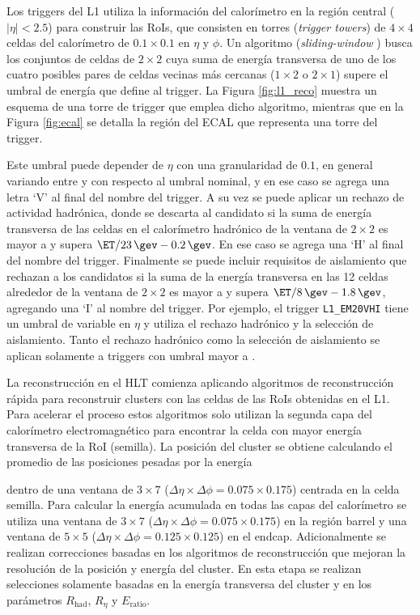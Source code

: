 Los triggers del L1 utiliza la información del calorímetro en la región central ($|\eta|<2.5$) para construir las RoIs, que consisten en torres (\textit{trigger towers}) de $4\times4$ celdas del calorímetro de $0.1\times0.1$ en $\eta$ y $\phi$. Un algoritmo (\textit{sliding-window} \cite{Lampl:1099735}) busca los conjuntos de celdas de $2\times2$ cuya suma de energía transversa de uno de los cuatro posibles pares de celdas vecinas más cercanas ($1\times2$ o $2\times1$) supere el umbral de energía que define al trigger. La Figura \ref{fig:l1_reco} muestra un esquema de una torre de trigger que emplea dicho algoritmo, mientras que en la Figura \ref{fig:ecal} se detalla la región del ECAL que representa una torre del trigger.


Este umbral puede depender de $\eta$ con una granularidad de $0.1$, en general variando entre  y  con respecto al umbral nominal, y en ese caso se agrega una letra `V' al final del nombre del trigger. A su vez se puede aplicar un rechazo de actividad hadrónica, donde se descarta al candidato si la suma de energía transversa de las celdas en el calorímetro hadrónico de la ventana de $2\times2$ es mayor a  y supera $\ET/23\,\gev-0.2\,\gev$. En ese caso se agrega una `H' al final del nombre del trigger. Finalmente se puede incluir requisitos de aislamiento que rechazan a los candidatos si la suma de la energía transversa en las 12 celdas alrededor de la ventana de $2\times2$ es mayor a  y supera $\ET/8\,\gev-1.8\,\gev$, agregando una `I' al nombre del trigger. Por ejemplo, el trigger \texttt{L1\_EM20VHI} tiene un umbral de  variable en $\eta$ y utiliza el rechazo hadrónico y la selección de aislamiento. Tanto el rechazo hadrónico como la selección de aislamiento se aplican solamente a triggers con umbral mayor a .



La reconstrucción en el HLT comienza aplicando algoritmos de reconstrucción rápida para reconstruir clusters con las celdas de las RoIs obtenidas en el L1. Para acelerar el proceso estos algoritmos solo utilizan la segunda capa del calorímetro electromagnético para encontrar la celda con mayor energía transversa de la RoI (semilla). La posición del cluster se obtiene calculando el promedio de las posiciones pesadas por la energía

dentro de una ventana de $3\times7$ ($\Delta\eta\times\Delta\phi = 0.075\times0.175$) centrada en la celda semilla. Para calcular la energía acumulada 
en todas las capas del calorímetro
se utiliza una ventana de $3\times7$ ($\Delta\eta\times\Delta\phi = 0.075\times0.175$) en la región barrel y una ventana de $5\times5$ ($\Delta\eta\times\Delta\phi = 0.125\times0.125$) en el endcap. Adicionalmente se realizan correcciones basadas en los algoritmos de reconstrucción que mejoran la resolución de la posición y energía del cluster. En esta etapa se realizan selecciones solamente basadas en la energía transversa del cluster y en los parámetros $R_{\text{had}}$, $R_{\eta}$ y $E_{\text{ratio}}$.



